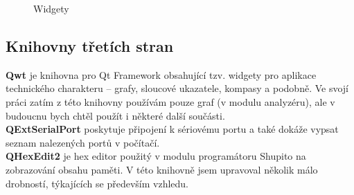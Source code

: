 \documentclass[12pt, a4paper, oneside]{article}
\begin{document}
\begin{figure}[H]
\begin{center}
\hfill
{}  
\caption{Widgety}
\label{widgets}
\end{center}
\end{figure}





\subsection*{Knihovny třetích stran}
{\bf Qwt}\cite{qwt_link} je knihovna pro Qt Framework obsahující tzv. widgety pro aplikace technického charakteru -- grafy, sloucové ukazatele, kompasy a podobně. Ve svojí práci
zatím z této knihovny používám pouze graf (v modulu analyzéru), ale v budoucnu bych chtěl použít i některé další součásti. \\
{\bf QExtSerialPort}\cite{qext_link} poskytuje připojení k sériovému portu a také dokáže vypsat seznam nalezených portů v počítačí.\\
{\bf QHexEdit2}\cite{qhex_link} je hex editor použitý v modulu programátoru Shupito na zobrazování obsahu paměti. V této knihovně jsem upravoval několik málo drobností, 
týkajících se především vzhledu.
\end{document}
